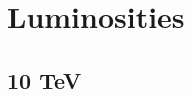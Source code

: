 \documentclass[a4paper,11pt]{article}
\begin{document}
%
%
%

\clearpage
\section{Luminosities}

\subsection{10 TeV}
\end{document}
